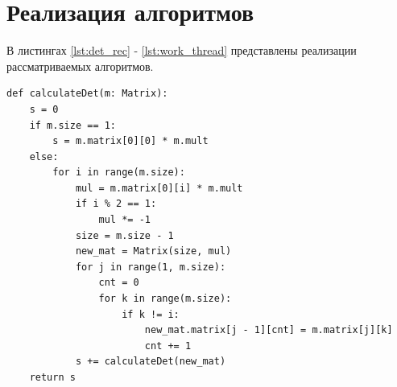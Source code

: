 \documentclass[a4paper,oneside,14pt]{extreport}
\begin{document}
\section{Реализация алгоритмов}
В листингах \ref{lst:det_rec} - \ref{lst:work_thread} представлены реализации рассматриваемых алгоритмов.
\captionsetup{singlelinecheck=false, justification=raggedright}
\begin{lstlisting}[caption=Рекурсивный алгоритм вычисления определителя матрицы, label={lst:det_rec}]
def calculateDet(m: Matrix):
	s = 0                                                   
	if m.size == 1:                                         
		s = m.matrix[0][0] * m.mult                         
	else:                                                   
		for i in range(m.size):                             
			mul = m.matrix[0][i] * m.mult
			if i % 2 == 1:               
				mul *= -1                    
			size = m.size - 1            
			new_mat = Matrix(size, mul)  
			for j in range(1, m.size):   
				cnt = 0                      
				for k in range(m.size):      
					if k != i:                   
						new_mat.matrix[j - 1][cnt] = m.matrix[j][k] 
						cnt += 1                                    
			s += calculateDet(new_mat)                  
	return s      
\end{lstlisting}
\end{document}
